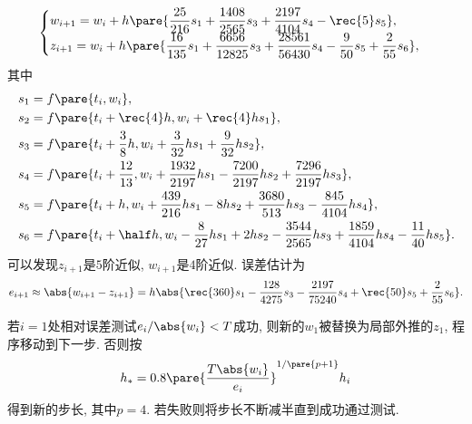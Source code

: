 \documentclass{ctexart}
\begin{document}
\begin{ex}
    \[ \begin{cases}
        \displaystyle w_{i+1} = w_i + h\pare{\frac{25}{216}s_1 + \frac{1408}{2565}s_3 + \frac{2197}{4104}s_4 - \rec{5}s_5}, \\
        \displaystyle z_{i+1} = w_i + h\pare{\frac{16}{135}s_1 + \frac{6656}{12825}s_3 + \frac{28561}{56430}s_4 - \frac{9}{50}s_5 + \frac{2}{55}s_6},
    \end{cases} \]
    其中
    \begin{align*}
        s_1 &= f\pare{t_i,w_i}, \\
        s_2 &= f\pare{t_i + \rec{4}h, w_i + \rec{4}hs_1}, \\
        s_3 &= f\pare{t_i + \frac{3}{8}h, w_i + \frac{3}{32}hs_1 + \frac{9}{32}hs_2}, \\
        s_4 &= f\pare{t_i + \frac{12}{13}, w_i + \frac{1932}{2197}hs_1 - \frac{7200}{2197}hs_2 + \frac{7296}{2197}hs_3}, \\
        s_5 &= f\pare{t_i + h, w_i + \frac{439}{216}hs_1 - 8hs_2 + \frac{3680}{513}hs_3 - \frac{845}{4104}hs_4}, \\
        s_6 &= f\pare{t_i + \half h, w_i - \frac{8}{27} hs_1 + 2hs_2 - \frac{3544}{2565}hs_3 + \frac{1859}{4104}hs_4 - \frac{11}{40}hs_5}.
    \end{align*}
    可以发现$z_{i+1}$是$5$阶近似, $w_{i+1}$是$4$阶近似. 误差估计为
    \[ e_{i+1} \approx \abs{w_{i+1} - z_{i+1}} = h\abs{\rec{360}s_1 - \frac{128}{4275}s_3 - \frac{2197}{75240}s_4 + \rec{50}s_5 + \frac{2}{55}s_6}. \]
\end{ex}
若$i=1$处相对误差测试$e_i/\abs{w_i} < T$成功, 则新的$w_1$被替换为局部外推的$z_1$, 程序移动到下一步. 否则按
\[ h_* = 0.8 \pare{\frac{T\abs{w_i}}{e_i}}^{1/\pare{p+1}}h_i \]
得到新的步长, 其中$p=4$. 若失败则将步长不断减半直到成功通过测试.
\end{document}
